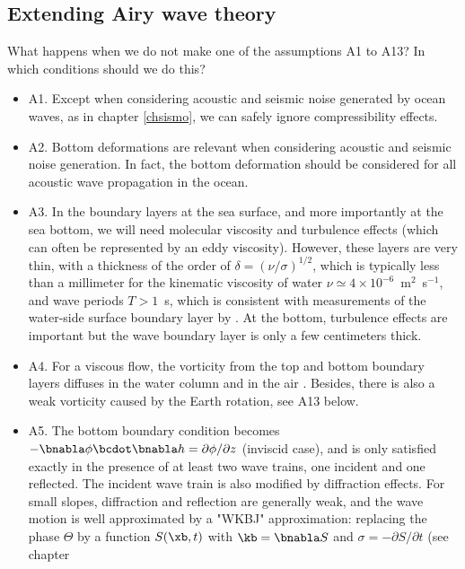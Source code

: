 \subsection{Extending Airy wave theory}
What happens when we do not make one of the assumptions A1 to A13? In which conditions should we do this? 
\begin{itemize}
  \item A1. Except when considering acoustic and seismic noise generated by ocean waves, as in chapter \ref{chsismo}, we can 
safely ignore compressibility effects. \vspace{0.3cm}
  \item A2. Bottom deformations are relevant when considering acoustic and seismic noise generation. In fact, the bottom 
deformation should be considered for all acoustic wave propagation in the ocean.  \vspace{0.3cm}
  \item A3. In the boundary layers at the sea surface, and more importantly at the sea bottom, 
we will need molecular viscosity and turbulence effects (which can often be represented by an eddy viscosity). 
However, these layers are very thin, with a thickness of the order of 
  $\delta=(\nu/\sigma)^{1/2}$, which is typically less than a millimeter for the kinematic viscosity of water 
$\nu \simeq 4\times 10^{-6}$~m$^2$~s$^{-1}$, and wave periods 
   $T > 1$~s, which is consistent with measurements of the water-side surface boundary layer by \cite{Banner&Peirson1998}. At the bottom, 
turbulence effects are important but the wave boundary layer is only a few centimeters thick.\vspace{0.3cm}
  \item A4. For a viscous flow, the vorticity from the top and bottom boundary layers diffuses in the water column 
and in the air \citep{Longuet-Higgins1953,Weber&Forland1990}. Besides, there is also a weak vorticity caused by the 
Earth rotation, see A13 below. \vspace{0.3cm}
  \item A5. The bottom boundary condition becomes $-\bnabla \phi \bcdot \bnabla h = \partial \phi/\partial z$ (inviscid case), 
and is only satisfied exactly in the presence of at least two wave trains, one incident and one reflected. The incident wave train 
is also modified by diffraction effects.
  For small slopes, diffraction and reflection are generally weak, 
and the wave motion is well approximated by a "WKBJ" approximation: replacing the phase  $\Theta$ by a function  $S(\xb,t)$ 
with $\kb=\bnabla S$ and $\sigma=-\partial S/\partial t$ (see chapter 

\end{itemize}
